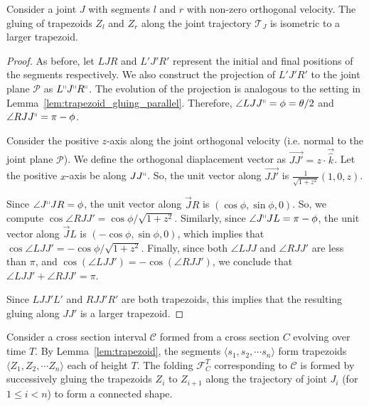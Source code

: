 
\begin{lemma}
\label{lem:trapezoid_gluing}
Consider a joint $J$ with segments $l$ and $r$ with non-zero orthogonal velocity.
The gluing of trapezoids $Z_l$ and $Z_r$ along the joint trajectory $\mathcal T_J$ is isometric to a larger trapezoid.
\end{lemma}
\begin{proof}
As before, let $LJR$ and $L'J'R'$ represent the initial and final positions of the segments respectively.
We also construct the projection of $L'J'R'$ to the joint plane $\mathcal P$ as $L^\shortparallel J^\shortparallel R^\shortparallel$.
The evolution of the projection is analogous to the setting in Lemma~\ref{lem:trapezoid_gluing_parallel}.
Therefore, $\angle LJJ^\shortparallel = \phi = \theta/2$ and $\angle RJJ^\shortparallel = \pi-\phi$.

Consider the positive $z$-axis along the joint orthogonal velocity (i.e. normal to the joint plane $\mathcal P$).
We define the orthogonal diaplacement vector as $\overrightarrow{JJ'} = z\cdot\vec{\hat k}$.
Let the positive $x$-axis be along $JJ^\shortparallel$. So, the unit vector along $\overrightarrow{JJ'}$ is $\frac{1}{\sqrt{1+z^2}}(1,0,z)$.

Since $\angle J^\shortparallel JR = \phi$, the unit vector along $\overrightarrow JR$ is $(\cos\phi,\sin\phi,0)$.
So, we compute $\cos \angle RJJ' = \cos\phi/\sqrt{1+z^2}$.
Similarly, since $\angle J^\shortparallel JL = \pi-\phi$, the unit vector along $\overrightarrow JL$ is $(-\cos\phi,\sin\phi,0)$,
which implies that $\cos \angle LJJ' = -\cos\phi/\sqrt{1+z^2}$.
Finally, since both $\angle LJJ$ and $\angle RJJ'$ are less than $\pi$, and $\cos\left(\angle LJJ' \right) = -\cos\left(\angle RJJ' \right)$,
we conclude that $\angle LJJ' + \angle RJJ' = \pi$.

Since $LJJ'L'$ and $RJJ'R'$ are both trapezoids, this implies that the resulting gluing along $JJ'$ is a larger trapezoid.
\end{proof}

\begin{definition}
\label{def:interval_folding}
Consider a cross section interval $\mathcal C$ formed from a cross section $C$ evolving over time $T$.
By Lemma~\ref{lem:trapezoid}, the segments $ \langle s_1, s_2,\cdots s_n \rangle$ form trapezoids
$ \langle Z_1, Z_2,\cdots Z_n \rangle$ each of height $T$.
The folding $\mathcal F_C^T$ corresponding to $\mathcal C$ is formed by successively gluing the trapezoids
$Z_i$ to $Z_{i+1}$ along the trajectory of joint $J_i$ (for $1\le i<n$) to form a connected shape.
\end{definition}


